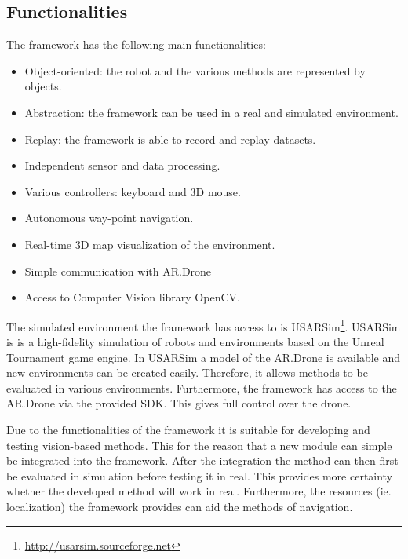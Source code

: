 \documentclass[a4paper]{article}
\begin{document}
\begin{appendices}
\subsection{Functionalities}
The framework has the following main functionalities:
\begin{itemize}
\item Object-oriented: the robot and the various methods are represented by objects.
\item Abstraction: the framework can be used in a real and simulated environment.
\item Replay: the framework is able to record and replay datasets.
\item Independent sensor and data processing.
\item Various controllers: keyboard and 3D mouse.
\item Autonomous way-point navigation.
\item Real-time 3D map visualization of the environment.
\item Simple communication with AR.Drone
\item Access to Computer Vision library OpenCV.
\end{itemize}
The simulated environment the framework has access to is  USARSim\footnote{\url{http://usarsim.sourceforge.net}}. USARSim is is a high-fidelity simulation of robots and environments based on the Unreal Tournament game engine. In USARSim a model of the AR.Drone is available and new environments can be created easily. Therefore, it allows methods to be evaluated in various environments. Furthermore, the framework has access to the AR.Drone via the provided SDK. This gives full control over the drone.

Due to the functionalities of the framework it is suitable for developing and testing vision-based methods. This for the reason that a new module can simple be integrated into the framework. After the integration the method can then first be evaluated in simulation before testing it in real. This provides more certainty whether the developed method will work in real. Furthermore, the resources (ie. localization) the framework provides can aid the methods of navigation.


\end{appendices}
\end{document}
